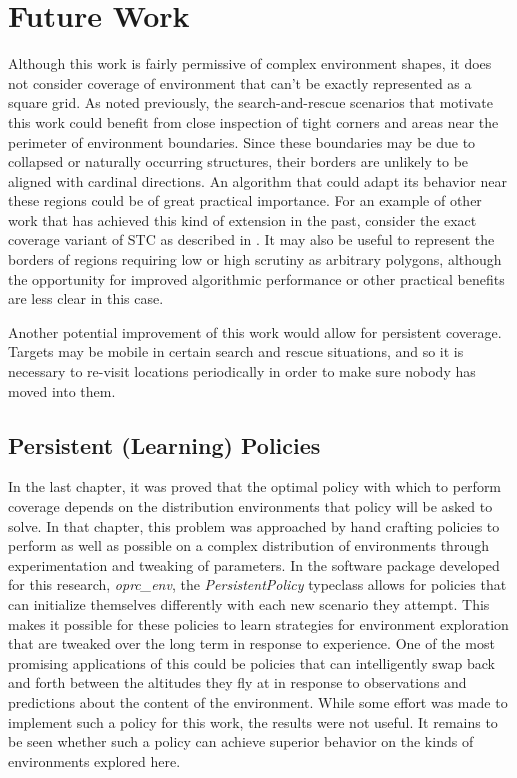 
\section{Future Work}

Although this work is fairly permissive of complex environment shapes, it does not consider coverage of environment that can't be exactly represented as a square grid. As noted previously, the search-and-rescue scenarios that motivate this work could benefit from close inspection of tight corners and areas near the perimeter of environment boundaries. Since these boundaries may be due to collapsed or naturally occurring structures, their borders are unlikely to be aligned with cardinal directions. An algorithm that could adapt its behavior near these regions could be of great practical importance. For an example of other work that has achieved this kind of extension in the past, consider the exact coverage variant of STC as described in \cite{STC}. It may also be useful to represent the borders of regions requiring low or high scrutiny as arbitrary polygons, although the opportunity for improved algorithmic performance or other practical benefits are less clear in this case.

Another potential improvement of this work would allow for persistent coverage. Targets may be mobile in certain search and rescue situations, and so it is necessary to re-visit locations periodically in order to make sure nobody has moved into them. %

\subsection{Persistent (Learning) Policies}

In the last chapter, it was proved that the optimal policy with which to perform coverage depends on the distribution environments that policy will be asked to solve. In that chapter, this problem was approached by hand crafting policies to perform as well as possible on a complex distribution of environments through experimentation and tweaking of parameters. In the software package developed for this research, \textit{oprc\_env}, the \textit{PersistentPolicy} typeclass allows for policies that can initialize themselves differently with each new scenario they attempt. This makes it possible for these policies to learn strategies for environment exploration that are tweaked over the long term in response to experience. One of the most promising applications of this could be policies that can intelligently swap back and forth between the altitudes they fly at in response to observations and predictions about the content of the environment. While some effort was made to implement such a policy for this work, the results were not useful. It remains to be seen whether such a policy can achieve superior behavior on the kinds of environments explored here.

